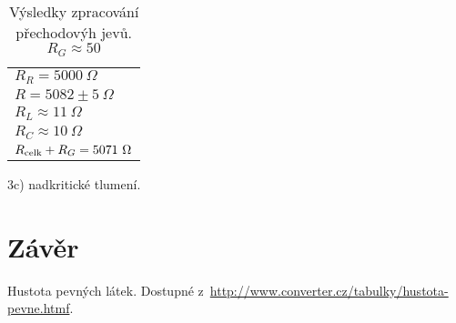 \documentclass[a4paper,11pt]{article}
\begin{document}
\begin{table}[htpb]
\begin{minipage}[b]{.25\linewidth}
\begin{tabular}{l}
            $R_R=5000\ \Omega$\\
            $R=5082 \pm 5\ \Omega$\\
            $ R_L \approx 11\ \Omega $ \\
            $ R_C \approx 10\ \Omega $ \\
            $R_{\rm celk}+R_G=5071\ \Omega$\\
            \hline \hline
        \end{tabular}
        \captionsetup{labelformat=empty}
        \caption{3c) nadkritické tlumení.}
    \end{minipage}
    \hfill
    \caption{Výsledky zpracování přechodovýh jevů. $ R_G \approx 50 $  }
\end{table}

\section{Závěr}

\begin{thebibliography}{0}
 Hustota pevných látek. Dostupné z~\url{http://www.converter.cz/tabulky/hustota-pevne.htmf}.   
\end{thebibliography}
\end{document}
